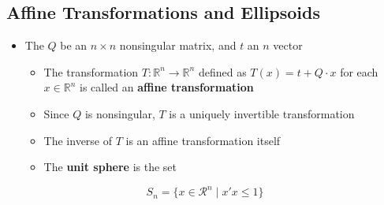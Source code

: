 \documentclass[11pt]{article}
\begin{document}
\subsection{Affine Transformations and Ellipsoids}
\label{sec:org363e513}
\begin{itemize}
\item The \(Q\) be an \(n \times n\) nonsingular matrix, and \(t\) an \(n\) vector
\begin{itemize}
\item The transformation \(T: \mathbb R^n \rightarrow \mathbb R^n\) defined as \(T(x) = t + Q \cdot x\) for each \(x \in \mathbb R^n\) is called an \textbf{affine transformation}
\item Since \(Q\) is nonsingular, \(T\) is a uniquely invertible transformation
\item The inverse of \(T\) is an affine transformation itself
\item The \textbf{unit sphere} is the set
\end{itemize}
\end{itemize}
\begin{equation}
  S_n = \{x \in \mathcal R^n \mid x'x \leq 1\}
\end{equation}
\end{document}
